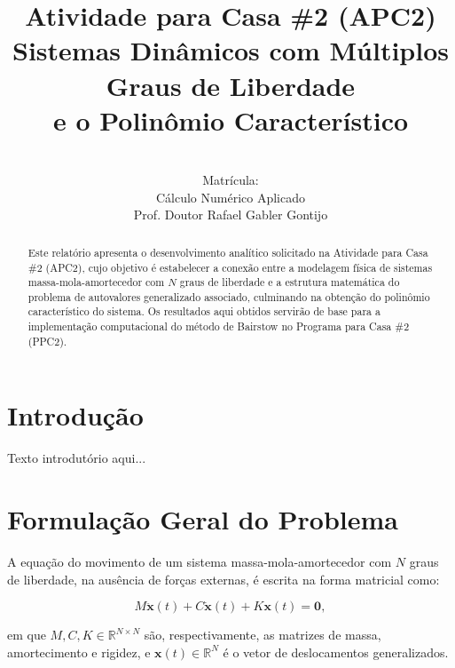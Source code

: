 \documentclass[12pt,a4paper]{article}
\title{
    \vspace{-1.5cm}
    \textbf{Atividade para Casa \#2 (APC2)} \\
    \large Sistemas Dinâmicos com Múltiplos Graus de Liberdade \\
    \large e o Polinômio Característico
}
\author{\nomealuno \\ Matrícula: \matriculaaluno \\[0.3cm]
    Cálculo Numérico Aplicado \\
    Prof. Doutor Rafael Gabler Gontijo}
\date{\datadoc}
\begin{document}
\maketitle

\begin{abstract}
\noindent Este relatório apresenta o desenvolvimento analítico solicitado na Atividade
para Casa \#2 (APC2), cujo objetivo é estabelecer a conexão entre a modelagem física de
sistemas massa-mola-amortecedor com $N$ graus de liberdade e a estrutura matemática do
problema de autovalores generalizado associado, culminando na obtenção do polinômio
característico do sistema. Os resultados aqui obtidos servirão de base para a
implementação computacional do método de Bairstow no Programa para Casa \#2 (PPC2).
\end{abstract}

\tableofcontents
\newpage

\section{Introdução}


Texto introdutório aqui...

\section{Formulação Geral do Problema}

A equação do movimento de um sistema massa-mola-amortecedor com $N$ graus de
liberdade, na ausência de forças externas, é escrita na forma matricial como:

\begin{equation}
    M\ddot{\mathbf{x}}(t) + C\dot{\mathbf{x}}(t) + K\mathbf{x}(t) = \mathbf{0},
    \label{eq:eom}
\end{equation}

\noindent em que $M, C, K \in \mathbb{R}^{N\times N}$ são, respectivamente, as
matrizes de massa, amortecimento e rigidez, e $\mathbf{x}(t) \in \mathbb{R}^N$ é o
vetor de deslocamentos generalizados.
\end{document}
